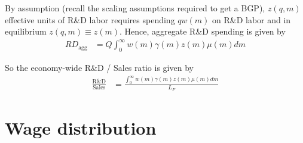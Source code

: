 \documentclass[12pt,english]{article}
\theoremstyle{remark}
\begin{document}
By assumption (recall the scaling assumptions required to get a BGP), $z(q,m)$ effective units of R\&D labor requires spending $q w(m)$ on R\&D labor and in equilibrium $z(q,m) \equiv z(m)$. Hence, aggregate R\&D spending is given by 
\begin{align*}
	RD_{\textrm{agg}} &= Q \int_0^{\infty} w(m) \gamma(m) z(m) \mu(m) dm
\end{align*} 

So the economy-wide R\&D / Sales ratio is given by 
\begin{align*}
	\frac{\textrm{R\&D}}{\textrm{Sales}} &= \frac{\int_0^{\infty} w(m) \gamma(m) z(m) \mu(m) dm}{L_F}
\end{align*}

\section{Wage distribution}
\end{document}
